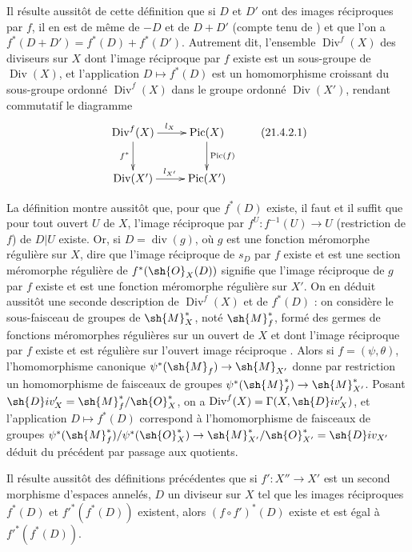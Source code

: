 Il résulte aussitôt de cette définition que si $D$ et $D'$ ont des images réciproques par $f$, il en est de même de $-D$ et de $D+D'$ (compte tenu de ) et que l'on a
$f^*(D+D')=f^*(D)+f^*(D')$.
Autrement dit, l'ensemble $\operatorname{Div}^f(X)$ des diviseurs sur $X$ dont l'image réciproque par $f$ existe est un sous-groupe de $\operatorname{Div}(X)$, et l'application $D\mapsto f^*(D)$ est un homomorphisme croissant du sous-groupe ordonné $\operatorname{Div}^f(X)$ dans le groupe ordonné $\operatorname{Div}(X')$, rendant commutatif le diagramme
\[
\label{IV.21.4.2.1}
  \xymatrix{
    \operatorname{Div}^f(X) \ar[r]^{l_X} \ar[d]_{f^*} & \operatorname{Pic}(X) \ar[d]^{\operatorname{Pic}(f)} \\
    \operatorname{Div}(X') \ar[r]^{l_{X'}} & \operatorname{Pic}(X')
  }
  \tag{21.4.2.1}
\]

\begin{env}[21.4.3]
\label{IV.21.4.3}
La définition  montre aussitôt que, pour que $f^*(D)$ existe, il faut et il suffit que pour tout ouvert $U$ de $X$, l'image réciproque par $f^U:f^{-1}(U)\to U$ (restriction de $f$) de $D|U$ existe.
Or, si $D=\operatorname{div}(g)$, où $g$ est une fonction méromorphe régulière sur $X$, dire que l'image réciproque de $s_D$ par $f$ existe et est une section méromorphe régulière de $f^*(\sh{O}_X(D))$ signifie  que l'image réciproque de $g$ par $f$ existe et est une fonction méromorphe régulière sur $X'$.
On en déduit aussitôt une seconde description de $\operatorname{Div}^f(X)$ et de $f^*(D)$ : on considère le sous-faisceau de groupes de $\sh{M}_X^*$, noté $\sh{M}_f^*$, formé des germes de fonctions méromorphes régulières sur un ouvert de $X$ et dont l'image réciproque par $f$ existe et est régulière sur l'ouvert image réciproque .
Alors si $f=(\psi,\theta)$, l'homomorphisme canonique  $\psi^*(\sh{M}_f)\to\sh{M}_{X'}$ donne par restriction un homomorphisme de faisceaux de groupes $\psi^*(\sh{M}_f^*)\to\sh{M}_{X'}^*$.
Posant $\sh{D}iv_X'=\sh{M}_f^*/\sh{O}_X^*$, on a $\operatorname{Div}^f(X)=\Gamma(X,\sh{D}iv_X')$, et l'application $D\mapsto f^*(D)$ correspond à l'homomorphisme de faisceaux de groupes $\psi^*(\sh{M}_f^*)/\psi^*(\sh{O}_X^*)\to\sh{M}_{X'}^*/\sh{O}_{X'}^*=\sh{D}iv_{X'}$ déduit du précédent par passage aux quotients.
\end{env}

\begin{env}[21.4.4]
Il résulte aussitôt des définitions précédentes que si $f':X''\to X'$ est un second morphisme d'espaces annelés, $D$ un diviseur sur $X$ tel que les images réciproques $f^*(D)$ et $f'^*(f^*(D))$ existent, alors $(f\circ f')^*(D)$ existe et est égal à $f'^*(f^*(D))$.
\end{env}


